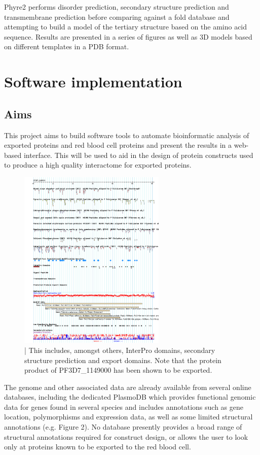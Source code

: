 \documentclass[fleqn,10pt]{article} %
\begin{document}
Phyre2 \cite{Kelley2009} performs disorder prediction, secondary structure prediction and transmembrane prediction before comparing against a fold database and attempting to build a model of the tertiary structure based on the amino acid sequence. Results are presented in a series of figures as well as 3D models based on different templates in a PDB format.

\section{Software implementation}
\subsection{Aims}

This project aims to build software tools to automate bioinformatic analysis of \pf exported proteins and red blood cell proteins and present the results in a web-based interface. This will be used to aid in the design of protein constructs used to produce a high quality interactome for exported \pf proteins. 


\begin{figure}
\includegraphics[width=7cm]{figs/plasmodbview}
\caption{ | This includes, amongst others, InterPro domains, secondary structure prediction and export domains. Note that the protein product of PF3D7\_1149000 has been shown to be exported.}
\end{figure}

The \pf genome and other associated data are already available from several online databases, including the dedicated PlasmoDB \cite{Aurrecoechea2009} which provides functional genomic data for genes found in several  species and includes annotations such as gene location, polymorphisms and expression data, as well as some limited structural annotations (e.g. Figure 2). No database presently provides a broad range of structural annotations required for construct design, or allows the user to look only at proteins known to be exported to the red blood cell.
\end{document}
